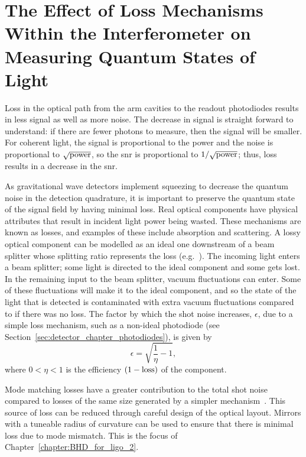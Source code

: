 \section{The Effect of Loss Mechanisms Within the Interferometer on Measuring Quantum States of Light}
\label{sec:detector_chapter_losses}
Loss in the optical path from the arm cavities to the readout photodiodes results in less signal as well as more noise. The decrease in signal is straight forward to understand: if there are fewer photons to measure, then the signal will be smaller. For coherent light, the signal is proportional to the power and the noise is proportional to $\sqrt{\rm{power}}$, so the \gls{snr} is proportional to $1/\sqrt{\rm{power}}$; thus, loss results in a decrease in the \gls{snr}. 
\par
As gravitational wave detectors implement squeezing to decrease the quantum noise in the detection quadrature, it is important to preserve the quantum state of the signal field by having minimal loss. Real optical components have physical attributes that result in incident light power being wasted. These mechanisms are known as losses, and examples of these include absorption and scattering. A lossy optical component can be modelled as an ideal one downstream of a beam splitter whose splitting ratio represents the loss (e.g.~\cite[Section 2]{Danilishin2012}). The incoming light enters a beam splitter; some light is directed to the ideal component and some gets lost. In the remaining input to the beam splitter, vacuum fluctuations can enter. Some of these fluctuations will make it to the ideal component, and so the state of the light that is detected is contaminated with extra vacuum fluctuations compared to if there was no loss. The factor by which the shot noise increases, $\epsilon$, due to a simple loss mechanism, such as a non-ideal photodiode (see Section~\ref{sec:detector_chapter_photodiodes}), is given by
\begin{equation}
\epsilon = \sqrt{\frac{1}{\eta} - 1},
\label{eq:detector_chapter_loss}
\end{equation}
where $0<\eta<1$ is the efficiency $(1-\rm{loss})$ of the component.
\par
Mode matching losses have a greater contribution to the total shot noise compared to losses of the same size generated by a simpler mechanism~\cite{McCuller2020}. This source of loss can be reduced through careful design of the optical layout. Mirrors with a tuneable radius of curvature can be used to ensure that there is minimal loss due to mode mismatch. This is the focus of Chapter~\ref{chapter:BHD_for_ligo_2}.
